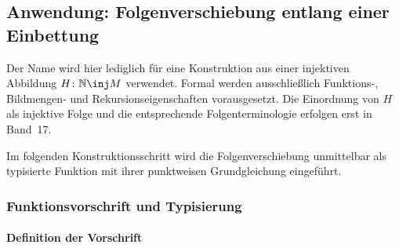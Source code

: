 \documentclass[main.tex]{subfiles}
\begin{document}
\begin{tabproof}



\end{tabproof}
\subsection{Anwendung: Folgenverschiebung entlang einer Einbettung}

Der Name wird hier lediglich für eine Konstruktion aus einer injektiven
Abbildung \(H\colon\mathbb N\inj M\) verwendet. Formal werden ausschließlich
Funktions-, Bildmengen- und Rekursionseigenschaften vorausgesetzt. Die
Einordnung von \(H\) als injektive Folge und die entsprechende
Folgenterminologie erfolgen erst in Band~17.

Im folgenden Konstruktionsschritt wird die Folgenverschiebung unmittelbar
als typisierte Funktion mit ihrer punktweisen Grundgleichung eingeführt.

\subsubsection{Funktionsvorschrift und Typisierung}

\paragraph{Definition der Vorschrift}
\end{document}
